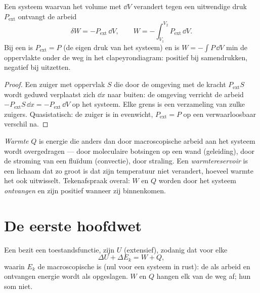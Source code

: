 \begin{proposition}\label{prop:b1:first-law:work}
Een systeem waarvan het volume met $\dd V$ verandert tegen een uitwendige druk
$P_{\mathrm{ext}}$ ontvangt de arbeid
\[
\delta W = -P_{\mathrm{ext}}\,\dd V, \qquad
W = -\int_{V_1}^{V_2}P_{\mathrm{ext}}\,\dd V .
\]
Bij een  is $P_{\mathrm{ext}} = P$ (de eigen druk
van het systeem) en is $W = -\int P\,\dd V$ min de oppervlakte onder de weg in het
clapeyrondiagram: positief bij samendrukken, negatief bij uitzetten.
\end{proposition}

\begin{proof}
Een zuiger met oppervlak $S$ die door de omgeving met de kracht
$P_{\mathrm{ext}}S$ wordt geduwd verplaatst zich $\dd x$ naar buiten: de omgeving verricht de arbeid
$-P_{\mathrm{ext}}S\,\dd x = -P_{\mathrm{ext}}\,\dd V$ op het systeem. Elke
grens is een verzameling van zulke zuigers. Quasistatisch: de zuiger is in
evenwicht, $P_{\mathrm{ext}} = P$ op een verwaarloosbaar verschil na.
\end{proof}

\begin{definition}[Warmte]\label{def:b1:first-law:heat}
\emph{Warmte} $Q$ is energie die anders dan door macroscopische arbeid
aan het systeem wordt overgedragen --- door moleculaire botsingen op een wand (geleiding),
door de stroming van een fluïdum (convectie), door straling. Een
\emph{warmtereservoir} is een lichaam dat zo groot is dat zijn temperatuur niet verandert,
hoeveel warmte het ook uitwisselt. Tekenafspraak overal: $W$ en $Q$ worden
door het systeem \emph{ontvangen} en zijn positief wanneer zij binnenkomen.
\end{definition}

\section{De eerste hoofdwet}

\begin{theorem}\label{thm:b1:first-law:firstlaw}
Een  bezit een toestandsfunctie, zijn \emph{}
$U$ (extensief), zodanig dat voor elke 
\[
\Delta U + \Delta E_{k} = W + Q ,
\]
waarin $E_k$ de macroscopische  is (nul voor een systeem in rust):
de als arbeid en  ontvangen energie wordt als  opgeslagen. $W$
en $Q$ hangen elk van de weg af; hun som niet.
\end{theorem}
\admitted

